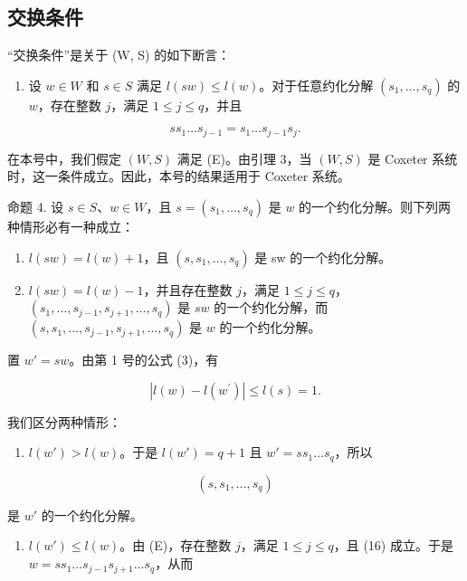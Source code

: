 \subsection{交换条件}

``交换条件''是关于 (W, S) 的如下断言：

\begin{enumerate}
\def\labelenumi{(\Alph{enumi})}
\setcounter{enumi}{4}
\tightlist
\item
  设 \(w \in W\) 和 \(s \in S\) 满足 \(l(sw) \leqslant l(w)\)。对于任意约化分解 \((s_1, \ldots, s_q)\) 的 \(w\)，存在整数 \(j\)，满足 \(1 \leqslant j \leqslant q\)，并且
\end{enumerate}

\[
s s _ {1} \dots s _ {j - 1} = s _ {1} \dots s _ {j - 1} s _ {j}.\tag{16}
\]

在本号中，我们假定 \((W,S)\) 满足 (E)。由引理 3，当 \((W,S)\) 是 Coxeter 系统时，这一条件成立。因此，本号的结果适用于 Coxeter 系统。

命题 4. 设 \(s \in S\)、\(w \in W\)，且 \(s = (s_1, \ldots, s_q)\) 是 \(w\) 的一个约化分解。则下列两种情形必有一种成立：

\begin{enumerate}
\def\labelenumi{\alph{enumi})}
\item
  \(l(sw) = l(w) + 1\)，且 \((s, s_1, \ldots, s_q)\) 是 sw 的一个约化分解。
\item
  \(l(sw) = l(w) - 1\)，并且存在整数 \(j\)，满足 \(1 \leqslant j \leqslant q\)，\((s_1, \ldots, s_{j-1}, s_{j+1}, \ldots, s_q)\) 是 \(sw\) 的一个约化分解，而 \((s, s_1, \ldots, s_{j-1}, s_{j+1}, \ldots, s_q)\) 是 \(w\) 的一个约化分解。
\end{enumerate}

置 \(w' = sw\)。由第 1 号的公式 (3)，有

\[
\left| l (w) - l \left(w ^ {\prime}\right) \right| \leqslant l (s) = 1.
\]

我们区分两种情形：

\begin{enumerate}
\def\labelenumi{\alph{enumi})}
\tightlist
\item
  \(l(w') > l(w)\)。于是 \(l(w') = q + 1\) 且 \(w' = ss_1 \ldots s_q\)，所以
\end{enumerate}

\[
\left(s, s _ {1}, \ldots , s _ {q}\right)
\]

是 \(w'\) 的一个约化分解。

\begin{enumerate}
\def\labelenumi{\alph{enumi})}
\setcounter{enumi}{1}
\tightlist
\item
  \(l(w') \leqslant l(w)\)。由 (E)，存在整数 \(j\)，满足 \(1 \leqslant j \leqslant q\)，且 (16) 成立。于是 \(w = ss_1 \ldots s_{j-1}s_{j+1} \ldots s_q\)，从而
\end{enumerate}


